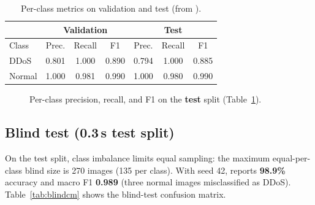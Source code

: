 \begin{table}[ht]
\centering
\caption[Per-class metrics on validation and test]{Per-class metrics on validation and test (from ).}
\begin{tabular}{|l|c|c|c|c|c|c|}
\hline
 & \multicolumn{3}{c|}{\textbf{Validation}} & \multicolumn{3}{c|}{\textbf{Test}} \\
\hline
Class & Prec. & Recall & F1 & Prec. & Recall & F1 \\
\hline
DDoS & 0.801 & 1.000 & 0.890 & 0.794 & 1.000 & 0.885 \\
\hline
Normal & 1.000 & 0.981 & 0.990 & 1.000 & 0.980 & 0.990 \\
\hline
\end{tabular}
\label{tab:perclass}
\end{table}

\begin{figure}[ht]
  \centering
  \caption[Per-class P/R/F1 on test]{Per-class precision, recall, and F1 on the \textbf{test} split (Table~\ref{tab:perclass}).}
  \label{fig:prf}
\end{figure}

\subsection{\texorpdfstring{Blind test (0.3\,s test split)}{Blind test (0.3 s test split)}}
On the test split, class imbalance limits equal sampling: the maximum
equal-per-class blind size is 270 images (135 per class). With seed 42,
 reports \textbf{98.9\%} accuracy and
macro F1 \textbf{0.989} (three normal images misclassified as DDoS).
Table~\ref{tab:blindcm} shows the blind-test confusion matrix.

